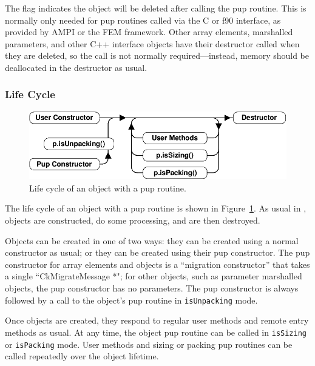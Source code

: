 The  flag indicates the object will be deleted
after calling the pup routine.  This is normally only needed for
pup routines called via the C or f90 interface, as provided by 
AMPI or the FEM framework.  Other \charmpp{} array elements, 
marshalled parameters, and other C++ interface objects 
have their destructor called when they are deleted, so the 
 call is not normally required---instead,
memory should be deallocated in the destructor as usual.


\subsubsection{Life Cycle}

\label{sec:lifecycle}

\begin{figure}[h]
\begin{center}
\includegraphics[width=6.0in]{fig/pup}
\end{center}
\caption{Life cycle of an object with a pup routine.}
\label{fig:pup}
\end{figure}

The life cycle of an object with a pup routine is shown in 
Figure~\ref{fig:pup}.  As usual in \CC{}, objects are 
constructed, do some processing, and are then destroyed.

Objects can be created in one of two ways: they can
be created using a normal constructor as usual; or they
can be created using their pup constructor.  The pup constructor
for \charmpp{} array elements and  objects
is a ``migration constructor'' that takes a single ``CkMigrateMessage *";
for other objects, such as parameter marshalled objects,
the pup constructor has no parameters.  The pup constructor
is always followed by a call to the object's pup routine in
\verb.isUnpacking. mode.

Once objects are created, they respond to regular user methods
and remote entry methods as usual.  At any time, the object 
pup routine can be called in \verb.isSizing. or \verb.isPacking.
mode.  User methods and sizing or packing pup routines can be called
repeatedly over the object lifetime.

